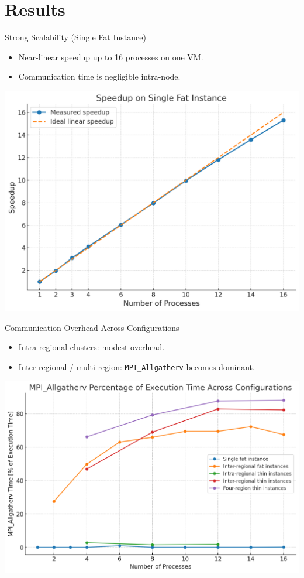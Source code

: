 \documentclass{beamer}
\begin{document}
\section{Results}
\begin{frame}{Strong Scalability (Single Fat Instance)}
  \begin{itemize}
    \item Near-linear speedup up to 16 processes on one VM.
    \item Communication time is negligible intra-node.
  \end{itemize}
  \vspace{0.5em}
  \centering
  \includegraphics[width=0.8\linewidth]{parallel_strong_scaling_16_cores.png}
\end{frame}

\begin{frame}{Communication Overhead Across Configurations}
  \begin{itemize}
    \item Intra-regional clusters: modest overhead.
    \item Inter-regional / multi-region: \texttt{MPI\_Allgatherv} becomes dominant.
  \end{itemize}
  \centering
  \includegraphics[width=0.85\linewidth]{communication_fraction_ex_time.png}
\end{frame}
\end{document}
